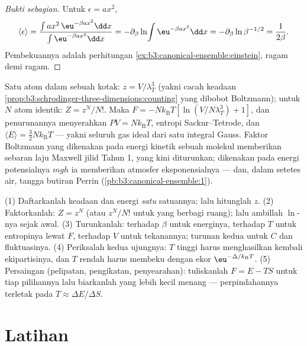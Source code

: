 \begin{proof}[Bukti sebagian]
Untuk $\epsilon = ax^2$,
\[
\langle\epsilon\rangle
 = \frac{\int ax^2\,\eu^{-\beta ax^2}\dd x}
        {\int\eu^{-\beta ax^2}\dd x}
 = -\partial_\beta\ln\!\int\eu^{-\beta ax^2}\dd x
 = -\partial_\beta\ln\beta^{-1/2} = \frac{1}{2\beta} .
\] Pembekuannya adalah perhitungan
\cref{ex:b3:canonical-ensemble:einstein}, ragam demi
ragam.
\end{proof}

\begin{example}\label{ex:b3:canonical-ensemble:gas}
Satu atom dalam sebuah kotak: $z = V/\lambda_T^3$ (yakni cacah keadaan
\cref{prop:b3:schrodinger-three-dimensions:counting} yang dibobot
Boltzmann); untuk $N$ atom identik: $Z = z^N/N!$. Maka $F =
-Nk_{\text{B}}T[\ln(V/N\lambda_T^3) + 1]$, dan penurunannya menyerahkan
$PV = Nk_{\text{B}}T$, entropi Sackur--Tetrode, dan
$\langle E\rangle = \tfrac32 Nk_{\text{B}}T$ --- yakni seluruh gas ideal
dari satu integral Gauss. Faktor Boltzmann yang dikenakan pada energi
kinetik sebuah molekul memberikan sebaran laju Maxwell jilid Tahun 1,
yang kini diturunkan; dikenakan pada energi potensialnya $mgh$ ia
memberikan atmosfer eksponensialnya --- dan, dalam setetes air, tangga
butiran Perrin
(\cref{pb:b3:canonical-ensemble:1}).
\end{example}

\begin{method}\label{met:b3:canonical-ensemble:method}
(1) Daftarkanlah keadaan dan energi \emph{satu} satuannya; lalu
hitunglah $z$. (2) Faktorkanlah: $Z = z^N$ (atau $z^N/N!$ untuk  yang berbagi ruang); lalu ambillah $\ln$-nya sejak awal. (3)
Turunkanlah: terhadap $\beta$ untuk energinya, terhadap $T$ untuk
entropinya lewat $F$, terhadap $V$ untuk tekanannya; turunan kedua untuk
$C$ dan fluktuasinya. (4) Periksalah kedua ujungnya: $T$ tinggi harus
menghasilkan kembali ekipartisinya, dan $T$ rendah harus membeku dengan
ekor $\eu^{-\Delta/k_{\text{B}}T}$. (5) Persaingan (pelipatan,
pengikatan, penyearahan): tuliskanlah $F = E - TS$ untuk tiap pilihannya
lalu biarkanlah yang lebih kecil menang --- perpindahannya terletak pada $T \approx \Delta
E/\Delta S$.
\end{method}

\section{Latihan}

